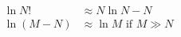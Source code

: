 \begin{align*}
\ln{N!}&\approx N \ln{N}-N\\
\ln{\left(M-N\right)}&\approx \ln{M}\textrm{ if }M \gg N\\
\end{align*}